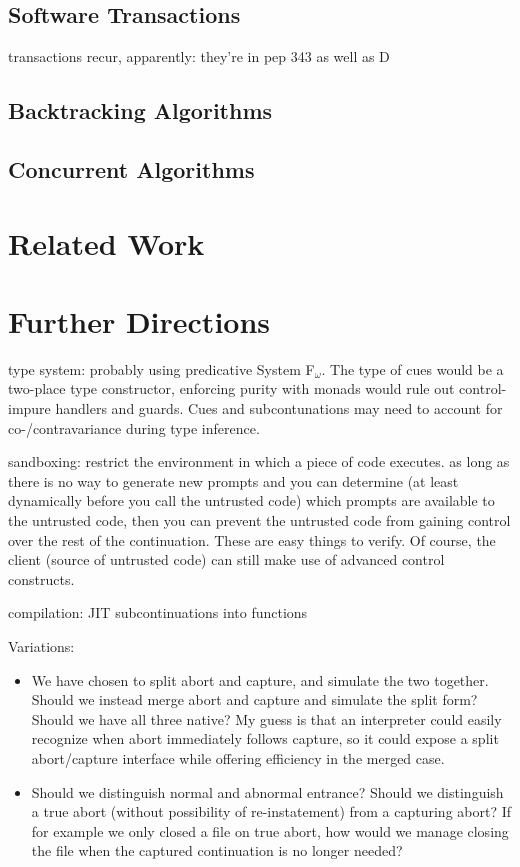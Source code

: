 \documentclass[11pt]{article}
\begin{document}
\subsection{Software Transactions}

transactions recur, apparently: they're in pep 343 as well as D

\subsection{Backtracking Algorithms}
\subsection{Concurrent Algorithms}

\section{Related Work}

\section{Further Directions}

type system: probably using predicative System F$_\omega$. The type of cues would be a two-place type constructor, enforcing purity with monads would rule out control-impure handlers and guards. Cues and subcontunations may need to account for co-/contravariance during type inference.

sandboxing: restrict the environment in which a piece of code executes. as long as there is no way to generate new prompts and you can determine (at least dynamically before you call the untrusted code) which prompts are available to the untrusted code, then you can prevent the untrusted code from gaining control over the rest of the continuation. These are easy things to verify. Of course, the client (source of untrusted code) can still make use of advanced control constructs.

compilation: JIT subcontinuations into functions

Variations:
\begin{itemize}
\item We have chosen to split abort and capture, and simulate the two together. Should we instead merge abort and capture and simulate the split form? Should we have all three native? My guess is that an interpreter could easily recognize when abort immediately follows capture, so it could expose a split abort/capture interface while offering efficiency in the merged case.
\item Should we distinguish normal and abnormal entrance? Should we distinguish a true abort (without possibility of re-instatement) from a capturing abort? If for example we only closed a file on true abort, how would we manage closing the file when the captured continuation is no longer needed?
\end{itemize}
\end{document}
